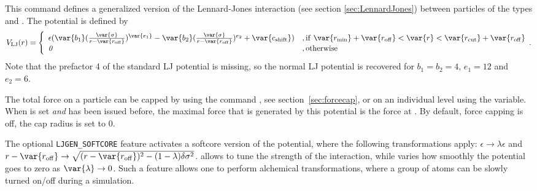This command defines a generalized version of the Lennard-Jones
interaction (see section \ref{sec:LennardJones}) between particles of
the types  and .  The potential is defined by
\begin{equation}
  \label{eq:lj-generic}
  V_\mathrm{LJ}(r) = \Biggl\{
    \begin{array}{ll}
      \epsilon(\var{b_1}(\frac{\var{\sigma}}{r-\var{r_\mathrm{off}}})^\var{e_1}
      -\var{b_2}(\frac{\var{\sigma}}{r-\var{r_\mathrm{off}}})^{e_2}+\var{c_\mathrm{shift}}) 
      & \mathrm{, if~} \var{r_\mathrm{min}}+\var{r_\mathrm{off}} < \var{r} < \var{r_\mathrm{cut}}+\var{r_\mathrm{off}}\\
      \mathit{0} 
      & \mathrm{, otherwise}\\
    \end{array}.
\end{equation}
Note that the prefactor 4 of the standard LJ potential is missing, so the normal
LJ potential is recovered for $b_1=b_2=4$, $e_1=12$ and $e_2=6$.

The total force on a particle can be capped by using the command
, see section~\ref{sec:forcecap}, or on an
individual level using the  variable. When
 is set \emph{and}  has been issued before, the maximal force that is generated by
this potential is the force at .  By default,
force capping is off, \ie the cap radius is set to 0.

The optional \texttt{LJGEN_SOFTCORE} feature activates a softcore version 
of the potential, where the following transformations apply: 
$\epsilon \rightarrow \lambda \epsilon$
and
$r-\var{r_\mathrm{off}} \rightarrow \sqrt{(r-\var{r_\mathrm{off}})^2 -
(1-\lambda) \delta \sigma^2}$. \var{\lambda} allows to tune the strength 
of the interaction, while \var{\delta} varies how smoothly the potential
goes to zero as $\var{\lambda}\rightarrow 0$. Such a feature allows one to
perform alchemical transformations, where a group of atoms can be slowly
turned on/off during a simulation.

